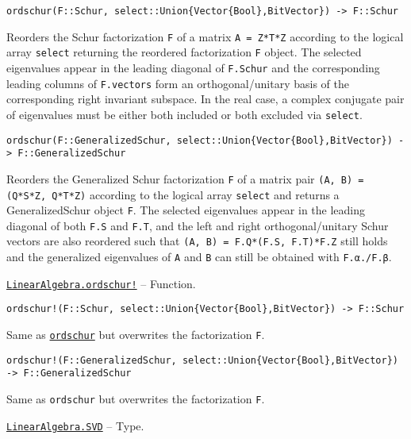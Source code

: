 \begin{adjustwidth}{2em}{0pt}


\begin{verbatim}
ordschur(F::Schur, select::Union{Vector{Bool},BitVector}) -> F::Schur
\end{verbatim}

Reorders the Schur factorization \texttt{F} of a matrix \texttt{A = Z*T*Z{\textquotesingle}} according to the logical array \texttt{select} returning the reordered factorization \texttt{F} object. The selected eigenvalues appear in the leading diagonal of \texttt{F.Schur} and the corresponding leading columns of \texttt{F.vectors} form an orthogonal/unitary basis of the corresponding right invariant subspace. In the real case, a complex conjugate pair of eigenvalues must be either both included or both excluded via \texttt{select}.




\begin{lstlisting}
ordschur(F::GeneralizedSchur, select::Union{Vector{Bool},BitVector}) -> F::GeneralizedSchur
\end{lstlisting}

Reorders the Generalized Schur factorization \texttt{F} of a matrix pair \texttt{(A, B) = (Q*S*Z{\textquotesingle}, Q*T*Z{\textquotesingle})} according to the logical array \texttt{select} and returns a GeneralizedSchur object \texttt{F}. The selected eigenvalues appear in the leading diagonal of both \texttt{F.S} and \texttt{F.T}, and the left and right orthogonal/unitary Schur vectors are also reordered such that \texttt{(A, B) = F.Q*(F.S, F.T)*F.Z{\textquotesingle}} still holds and the generalized eigenvalues of \texttt{A} and \texttt{B} can still be obtained with \texttt{F.α./F.β}.



\end{adjustwidth}
\hypertarget{871218922691469554}{} 
\hyperlink{871218922691469554}{\texttt{LinearAlgebra.ordschur!}}  -- {Function.}

\begin{adjustwidth}{2em}{0pt}


\begin{verbatim}
ordschur!(F::Schur, select::Union{Vector{Bool},BitVector}) -> F::Schur
\end{verbatim}

Same as \hyperlink{4329711108255537481}{\texttt{ordschur}} but overwrites the factorization \texttt{F}.




\begin{lstlisting}
ordschur!(F::GeneralizedSchur, select::Union{Vector{Bool},BitVector}) -> F::GeneralizedSchur
\end{lstlisting}

Same as \texttt{ordschur} but overwrites the factorization \texttt{F}.



\end{adjustwidth}
\hypertarget{10448068302163375703}{} 
\hyperlink{10448068302163375703}{\texttt{LinearAlgebra.SVD}}  -- {Type.}

